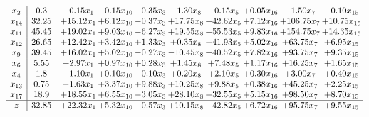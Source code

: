 \documentclass[9pt]{article}
\begin{document}
\[\begin{array}{c| c c@{\hskip 2pt} c@{\hskip 2pt} c@{\hskip 2pt} c@{\hskip 2pt} c@{\hskip 2pt} c@{\hskip 2pt} c@{\hskip 2pt} c@{\hskip 2pt} }
 x_{2}   &  0.3 & -0.15 x_{1} & -0.15 x_{10} & -0.35 x_{3} & -1.30 x_{8} & -0.15 x_{5} & +  0.05 x_{16} & -1.50 x_{7} & -0.10 x_{15}\\
 x_{14}   &  32.25 & + 15.12 x_{1} & +  6.12 x_{10} & -0.37 x_{3} & + 17.75 x_{8} & + 42.62 x_{5} & +  7.12 x_{16} & + 106.75 x_{7} & + 10.75 x_{15}\\
 x_{11}   &  45.45 & + 19.02 x_{1} & +  9.03 x_{10} & -6.27 x_{3} & + 19.55 x_{8} & + 55.53 x_{5} & +  9.83 x_{16} & + 154.75 x_{7} & + 14.35 x_{15}\\
 x_{12}   &  26.65 & + 12.42 x_{1} & +  3.42 x_{10} & +  1.33 x_{3} & +  0.35 x_{8} & + 41.93 x_{5} & +  5.02 x_{16} & + 63.75 x_{7} & +  6.95 x_{15}\\
 x_{9}   &  39.45 & + 16.02 x_{1} & +  5.02 x_{10} & -0.27 x_{3} & -10.45 x_{8} & + 40.52 x_{5} & +  7.82 x_{16} & + 93.75 x_{7} & +  9.35 x_{15}\\
 x_{6}   &  5.55 & +  2.97 x_{1} & +  0.97 x_{10} & +  0.28 x_{3} & +  1.45 x_{8} & +  7.48 x_{5} & +  1.17 x_{16} & + 16.25 x_{7} & +  1.65 x_{15}\\
 x_{4}   &  1.8 & +  1.10 x_{1} & +  0.10 x_{10} & -0.10 x_{3} & +  0.20 x_{8} & +  2.10 x_{5} & +  0.30 x_{16} & +  3.00 x_{7} & +  0.40 x_{15}\\
 x_{13}   &  0.75 & -1.63 x_{1} & +  3.37 x_{10} & +  9.88 x_{3} & + 10.25 x_{8} & +  9.88 x_{5} & +  0.38 x_{16} & + 45.25 x_{7} & +  2.25 x_{15}\\
 x_{17}   &  18.9 & + 18.55 x_{1} & +  6.55 x_{10} & -3.05 x_{3} & + 28.10 x_{8} & + 32.55 x_{5} & +  5.15 x_{16} & + 98.50 x_{7} & +  8.70 x_{15}\\
\hline
z    &  32.85 & + 22.32 x_{1} & +  5.32 x_{10} & -0.57 x_{3} & + 10.15 x_{8} & + 42.82 x_{5} & +  6.72 x_{16} & + 95.75 x_{7} & +  9.55 x_{15}\\
\end{array}\]
\end{document}
